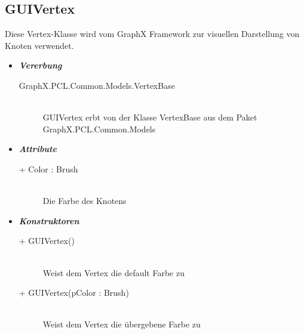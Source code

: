 \documentclass[13pt]{scrreprt}
\begin{document}
	\subsection{GUIVertex}
	Diese Vertex-Klasse wird vom GraphX Framework zur visuellen Darstellung von Knoten verwendet.
	\begin{itemize}[label = {$\circ$}]
		\item {\large \textbf{\textit{Vererbung}}\par}
		\begin{description}
			\item [GraphX.PCL.Common.Models.VertexBase] \hfill \\ GUIVertex erbt von der Klasse VertexBase aus dem Paket GraphX.PCL.Common.Models
		\end{description}
		\item {\large \textbf{\textit{Attribute}}\par}
		\begin{description}
			\item [+ Color : Brush] \hfill \\Die Farbe des Knotens
		\end{description}
		\item {\large \textbf{\textit{Konstruktoren}}\par}
		\begin{description}
			\item [+ GUIVertex()] \hfill \\ Weist dem Vertex die default Farbe zu
			\item [+ GUIVertex(pColor : Brush)] \hfill \\ Weist dem Vertex die übergebene Farbe zu
		\end{description}
	\end{itemize}
	
\end{document}

